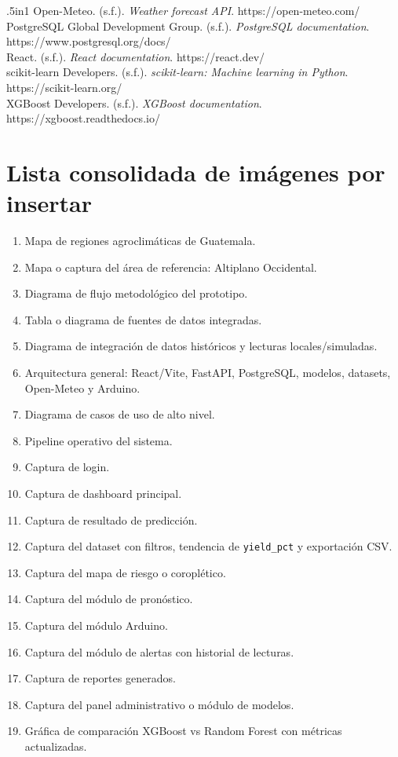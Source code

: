 \documentclass[12pt,letterpaper,oneside]{report}
\newcommand{\codigo}[1]{\texttt{#1}}
\begin{document}
\begin{hangparas}{.5in}{1}
Open-Meteo. (s.f.). \textit{Weather forecast API}. https://open-meteo.com/\\

PostgreSQL Global Development Group. (s.f.). \textit{PostgreSQL documentation}. https://www.postgresql.org/docs/\\

React. (s.f.). \textit{React documentation}. https://react.dev/\\

scikit-learn Developers. (s.f.). \textit{scikit-learn: Machine learning in Python}. https://scikit-learn.org/\\

XGBoost Developers. (s.f.). \textit{XGBoost documentation}. https://xgboost.readthedocs.io/\\
\end{hangparas}

\appendix
\chapter{Lista consolidada de imágenes por insertar}

\begin{enumerate}
\item Mapa de regiones agroclimáticas de Guatemala.
\item Mapa o captura del área de referencia: Altiplano Occidental.
\item Diagrama de flujo metodológico del prototipo.
\item Tabla o diagrama de fuentes de datos integradas.
\item Diagrama de integración de datos históricos y lecturas locales/simuladas.
\item Arquitectura general: React/Vite, FastAPI, PostgreSQL, modelos, datasets, Open-Meteo y Arduino.
\item Diagrama de casos de uso de alto nivel.
\item Pipeline operativo del sistema.
\item Captura de login.
\item Captura de dashboard principal.
\item Captura de resultado de predicción.
\item Captura del dataset con filtros, tendencia de \codigo{yield\_pct} y exportación CSV.
\item Captura del mapa de riesgo o coroplético.
\item Captura del módulo de pronóstico.
\item Captura del módulo Arduino.
\item Captura del módulo de alertas con historial de lecturas.
\item Captura de reportes generados.
\item Captura del panel administrativo o módulo de modelos.
\item Gráfica de comparación XGBoost vs Random Forest con métricas actualizadas.
\end{enumerate}
\end{document}
